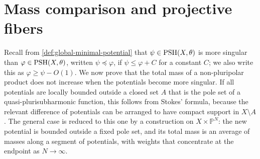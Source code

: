 \section{Mass comparison and projective fibers}
\label{sec:nonpluripolar-mass-monotonicity}
Recall from \cref{def:global-minimal-potential} that $\psi\in\mathrm{PSH}(X,\theta)$ is more singular than $\varphi\in\mathrm{PSH}(X,\theta)$, written $\psi\preceq\varphi$, if $\psi\leq\varphi+C$ for a constant $C$; we also write this as $\varphi\geq\psi-O(1)$. We now prove that the total mass of a non-pluripolar product does not increase when the potentials become more singular. If all potentials are locally bounded outside a closed set $A$ that is the pole set of a quasi-plurisubharmonic function, this follows from Stokes' formula, because the relevant difference of potentials can be arranged to have compact support in $X\setminus A$. The general case is reduced to this one by a construction on $X\times\mathbb P^N$: the new potential is bounded outside a fixed pole set, and its total mass is an average of masses along a segment of potentials, with weights that concentrate at the endpoint as $N\to\infty$.

